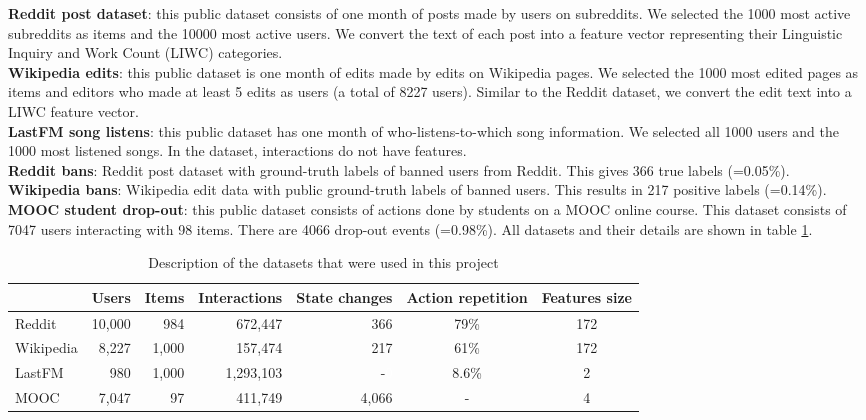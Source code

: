 \textbf{Reddit\supercite{Reddit} post dataset}: this public dataset consists of one month of posts made by users on subreddits. We selected the 1000 most active subreddits as items and the 10000 most active users. We convert the text of each post into a feature vector representing their Linguistic Inquiry and Work Count\supercite{pennebaker01LIWC} (LIWC) categories.\\
\textbf{Wikipedia\supercite{Wiki} edits}: this public dataset is one month of edits made by edits on Wikipedia pages. We selected the 1000 most edited pages as items and editors who made at least 5 edits as users (a total of 8227 users). Similar to the Reddit dataset, we convert the edit text into a LIWC feature vector.\\
\textbf{LastFM\supercite{10.1007/978-3-642-33486-3_5lastFM} song listens}: this public dataset has one month of who-listens-to-which song information. We selected all 1000 users and the 1000 most listened songs. In the dataset, interactions do not have features.\\
\textbf{Reddit bans}: Reddit post dataset with ground-truth labels of banned users from Reddit. This gives 366 true labels (=0.05\%).\\
\textbf{Wikipedia bans}: Wikipedia edit data with public ground-truth labels of banned users. This results in 217 positive labels (=0.14\%).\\
\textbf{MOOC\supercite{mooc} student drop-out}: this public dataset consists of actions done by students on a MOOC online course. This dataset consists of 7047 users interacting with 98 items. There are 4066 drop-out events (=0.98\%). All datasets and their details are shown in table \ref{description data}. \\

\begin{table}[H]
    \centering
    \begin{tabular}{@{}lrrrrcc@{}}
    \toprule
    & Users & Items & Interactions & State changes & Action repetition & Features size \\
    \midrule
    Reddit & 10,000 & 984 & 672,447 & 366 & 79\% & 172 \\
    Wikipedia & 8,227 & 1,000 & 157,474 & 217 & 61\% & 172 \\
    LastFM & 980 & 1,000 & 1,293,103 & -\textcolor{white}{0} & 8.6\% & 2 \\
    MOOC & 7,047 & 97 & 411,749 & 4,066 & - & 4 \\
    \bottomrule
    \end{tabular}
    \caption{Description of the datasets that were used in this project}
    \label{description data}
\end{table}

